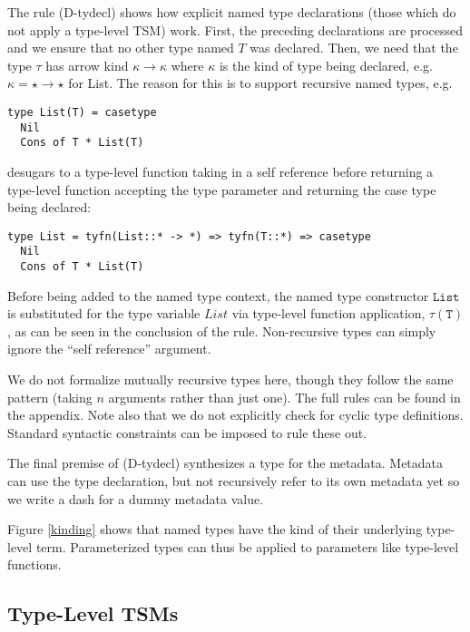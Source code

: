 \documentclass{sig-alternate}[10pt]
\makeatletter
\newcommand\BeraMonottfamily{%
  \def\fvm@Scale{0.85}%
  \fontfamily{fvm}\selectfont%
}
\newcommand{\lstinlinew}[1]{{\scriptsize\BeraMonottfamily #1}}
\makeatother
\begin{document}
The rule (D-tydecl) shows how explicit named type declarations (those which do not apply a type-level TSM) work. First, the preceding declarations are processed and we ensure that no other type named $T$ was declared. Then, we need that the type $\tau$ has arrow kind $\kappa \rightarrow \kappa$ where $\kappa$ is the kind of type being declared, e.g. $\kappa = \star \rightarrow \star$ for \lstinlinew{List}. The reason for this is to support recursive named types, e.g. 

\begin{lstlisting}[style=wyvern]
type List(T) = casetype
  Nil
  Cons of T * List(T)
\end{lstlisting}
\noindent
desugars to a type-level function taking in a self reference before returning a type-level function accepting the type parameter and returning the case type being declared:

\begin{lstlisting}[style=wyvern]
type List = tyfn(List::* -> *) => tyfn(T::*) => casetype 
  Nil 
  Cons of T * List(T)
\end{lstlisting}

Before being added to the named type context, the named type constructor $\mathtt{List}$ is substituted for the type variable $List$ via type-level function application, $\tau(\mathtt{T})$, as can be seen in the conclusion of the rule. Non-recursive types can simply ignore the ``self reference'' argument.

We do not formalize mutually recursive types here, though they follow the same pattern (taking $n$ arguments rather than just one). The full rules can be found in the appendix. Note also that we do not explicitly check for cyclic type definitions. Standard syntactic constraints can be imposed to rule these out. 

The final premise of (D-tydecl) synthesizes a type for the metadata. Metadata can use  the type declaration, but not recursively refer to its own metadata yet so we write a dash for a dummy metadata value.

Figure \ref{kinding} shows that named types have the kind of their underlying type-level term. Parameterized types can thus be applied to parameters like type-level functions.

\subsection{Type-Level TSMs}
\end{document}
